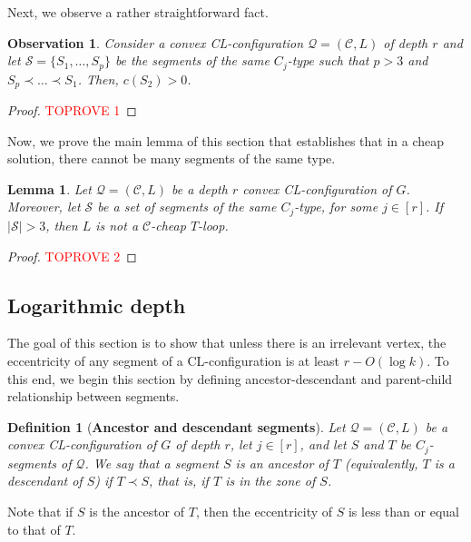 \documentclass{article}
\newtheorem{lemma}[theorem]{Lemma}
\newtheorem{observation}[theorem]{Observation}
\newtheorem{definition}[theorem]{Definition}
\numberwithin{claimcounter}{lemma}
\begin{document}
Next, we observe a rather straightforward fact.
\begin{observation}\label{O:free}
    Consider a convex CL-configuration $\mathcal{Q} = (\mathcal{C},L)$ of depth $r$ and let $\mathcal{S} = \{S_1,\ldots,S_p\}$ be the segments of the same $C_j$-type such that $p>3$ and $S_p \prec \ldots \prec S_1$. Then, $c(S_2) >0$. 
\end{observation}
\begin{proof}\textcolor{red}{TOPROVE 1}\end{proof}


Now, we prove the main lemma of this section that establishes that in a cheap solution, there cannot be many segments of the same type. 
\begin{lemma}\label{L:main}
   Let $\mathcal{Q}=(\mathcal{C},L)$ be a depth $r$ convex CL-configuration of $G$. Moreover, let $\mathcal{S}$ be a set of segments of the same $C_j$-type, for some $j\in [r]$. If $|\mathcal{S}|>3$, then $L$ is not a $\mathcal{C}$-cheap $T$-loop. 
\end{lemma}

\begin{proof}\textcolor{red}{TOPROVE 2}\end{proof}






\subsection{Logarithmic depth}\label{S:depth}

The goal of this section is to show that unless there is an irrelevant vertex, the eccentricity of any segment of a CL-configuration is at least $r-O(\log k)$.
To this end, we begin this section by defining ancestor-descendant and parent-child relationship between segments. 

\begin{definition}[\bf{Ancestor and descendant segments}]
Let $\mathcal{Q}=(\mathcal{C},L)$ be a  convex CL-configuration of $G$ of depth $r$, let $j\in[r]$, and let $S$ and $T$ be $C_j$-segments of $\mathcal{Q}$.
    We say that a segment $S$ is an \emph{ancestor} of $T$ (equivalently, $T$ is a \emph{descendant} of $S$) if $T \prec S$, that is, if $T$ is in the zone of $S$.
\end{definition}

Note that if $S$ is the ancestor of $T$, then the eccentricity of $S$ is less than or equal to that of $T$.
\end{document}
